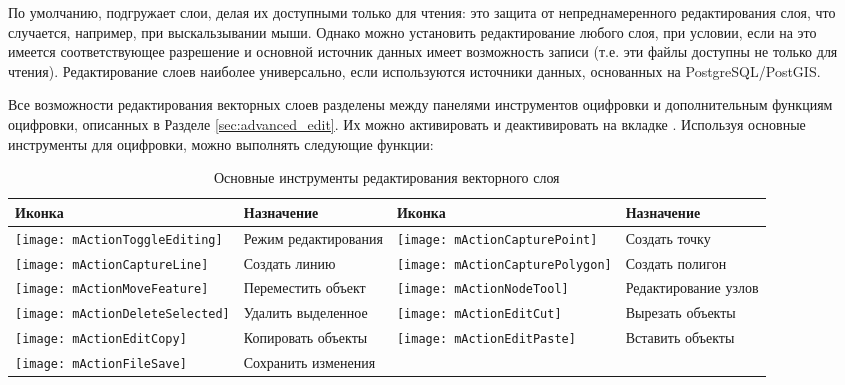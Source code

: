 По умолчанию, \qg подгружает слои, делая их доступными только для чтения:
это защита от непреднамеренного редактирования слоя, что случается, например,
при выскальзывании мыши. Однако можно установить редактирование любого слоя,
при условии, если на это имеется соответствующее разрешение и основной
источник данных имеет возможность записи (т.е. эти файлы доступны не только
для чтения). Редактирование слоев наиболее универсально, если используются
источники данных, основанных на PostgreSQL/PostGIS.

Все возможности редактирования векторных слоев разделены между панелями
инструментов оцифровки и дополнительным функциям оцифровки, описанных в
Разделе \ref{sec:advanced_edit}. Их можно активировать и деактивировать
на вкладке  \arrow {}.
Используя основные инструменты для оцифровки, можно выполнять следующие
функции:

\begin{table}[ht]
\centering
\begin{tabular}{|l|p{5.5cm}|l|p{5.5cm}|}
\hline \textbf{Иконка} & \textbf{Назначение} & \textbf{Иконка} & \textbf{Назначение} \\
\hline \texttt{[image: mActionToggleEditing]}
   & Режим редактирования
   & \texttt{[image: mActionCapturePoint]}
   & Создать точку \\
\hline \texttt{[image: mActionCaptureLine]}
   & Создать линию
   & \texttt{[image: mActionCapturePolygon]}
   & Создать полигон \\
\hline \texttt{[image: mActionMoveFeature]}
   & Переместить объект
   & \texttt{[image: mActionNodeTool]}
   & Редактирование узлов \\
\hline \texttt{[image: mActionDeleteSelected]}
   & Удалить выделенное
   & \texttt{[image: mActionEditCut]}
   & Вырезать объекты \\
\hline \texttt{[image: mActionEditCopy]}
   & Копировать объекты
   & \texttt{[image: mActionEditPaste]}
   & Вставить объекты \\
\hline \texttt{[image: mActionFileSave]}
   & Сохранить изменения
   &  &  \\
\hline
\end{tabular}
\caption{Основные инструменты редактирования векторного слоя}\label{tab:vector_editing}\medskip
\end{table}

